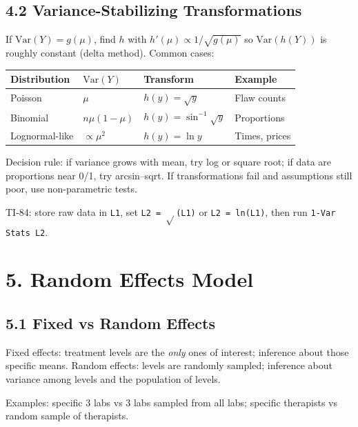 \documentclass[9pt,letterpaper]{article}
\begin{document}
\subsection{4.2 Variance-Stabilizing Transformations}

If $\text{Var}(Y)=g(\mu)$, find $h$ with $h'(\mu)\propto1/\sqrt{g(\mu)}$ so $\text{Var}(h(Y))$ is roughly constant (delta method). Common cases:

\begin{center}\small
\begin{tabular}{@{}llll@{}}
\toprule
Distribution & $\text{Var}(Y)$ & Transform & Example \\
\midrule
Poisson & $\mu$ & $h(y)=\sqrt{y}$ & Flaw counts \\
Binomial & $n\mu(1-\mu)$ & $h(y)=\sin^{-1}\sqrt{y}$ & Proportions \\
Lognormal-like & $\propto\mu^2$ & $h(y)=\ln y$ & Times, prices \\
\bottomrule
\end{tabular}
\end{center}

Decision rule: if variance grows with mean, try log or square root; if data are proportions near 0/1, try arcsin--sqrt. If transformations fail and assumptions still poor, use non-parametric tests.

\begin{calcbox}
TI-84: store raw data in \texttt{L1}, set \texttt{L2 = $\sqrt{}$(L1)} or \texttt{L2 = ln(L1)}, then run \texttt{1-Var Stats L2}.
\end{calcbox}

\section{5. Random Effects Model}

\subsection{5.1 Fixed vs Random Effects}

Fixed effects: treatment levels are the \emph{only} ones of interest; inference about those specific means. Random effects: levels are randomly sampled; inference about variance among levels and the population of levels.

Examples: specific 3 labs vs 3 labs sampled from all labs; specific therapists vs random sample of therapists.
\end{document}
